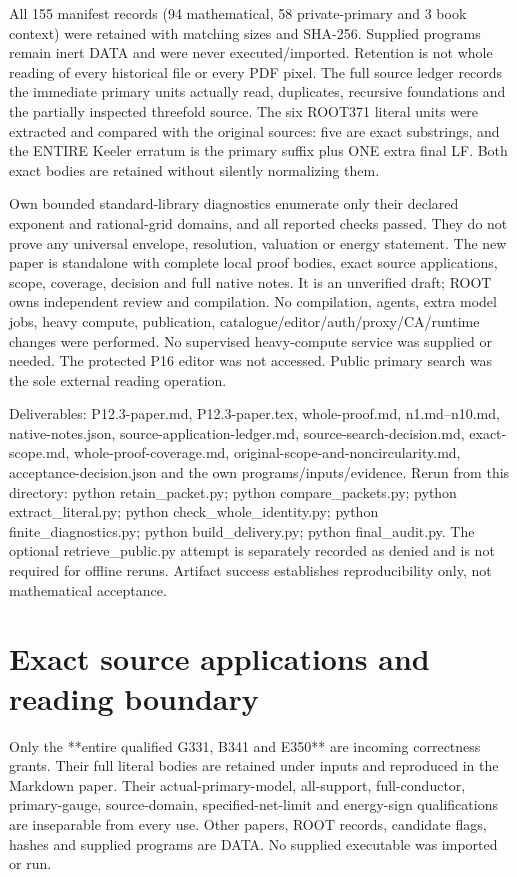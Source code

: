 \documentclass[11pt]{article}
\begin{document}
All 155 manifest records (94 mathematical, 58 private-primary and 3 book context) were retained with matching sizes and SHA-256. Supplied programs remain inert DATA and were never executed/imported. Retention is not whole reading of every historical file or every PDF pixel. The full source ledger records the immediate primary units actually read, duplicates, recursive foundations and the partially inspected threefold source. The six ROOT371 literal units were extracted and compared with the original sources: five are exact substrings, and the ENTIRE Keeler erratum is the primary suffix plus ONE extra final LF. Both exact bodies are retained without silently normalizing them.

Own bounded standard-library diagnostics enumerate only their declared exponent and rational-grid domains, and all reported checks passed. They do not prove any universal envelope, resolution, valuation or energy statement. The new paper is standalone with complete local proof bodies, exact source applications, scope, coverage, decision and full native notes. It is an unverified draft; ROOT owns independent review and compilation. No compilation, agents, extra model jobs, heavy compute, publication, catalogue/editor/auth/proxy/CA/runtime changes were performed. No supervised heavy-compute service was supplied or needed. The protected P16 editor was not accessed. Public primary search was the sole external reading operation.

Deliverables: P12.3-paper.md, P12.3-paper.tex, whole-proof.md, n1.md--n10.md, native-notes.json, source-application-ledger.md, source-search-decision.md, exact-scope.md, whole-proof-coverage.md, original-scope-and-noncircularity.md, acceptance-decision.json and the own programs/inputs/evidence. Rerun from this directory: python retain\_packet.py; python compare\_packets.py; python extract\_literal.py; python check\_whole\_identity.py; python finite\_diagnostics.py; python build\_delivery.py; python final\_audit.py. The optional retrieve\_public.py attempt is separately recorded as denied and is not required for offline reruns. Artifact success establishes reproducibility only, not mathematical acceptance. 

\section{Exact source applications and reading boundary}

Only the **entire qualified G331, B341 and E350** are incoming correctness grants. Their full literal bodies are retained under inputs and reproduced in the Markdown paper. Their actual-primary-model, all-support, full-conductor, primary-gauge, source-domain, specified-net-limit and energy-sign qualifications are inseparable from every use. Other papers, ROOT records, candidate flags, hashes and supplied programs are DATA. No supplied executable was imported or run.
\end{document}
